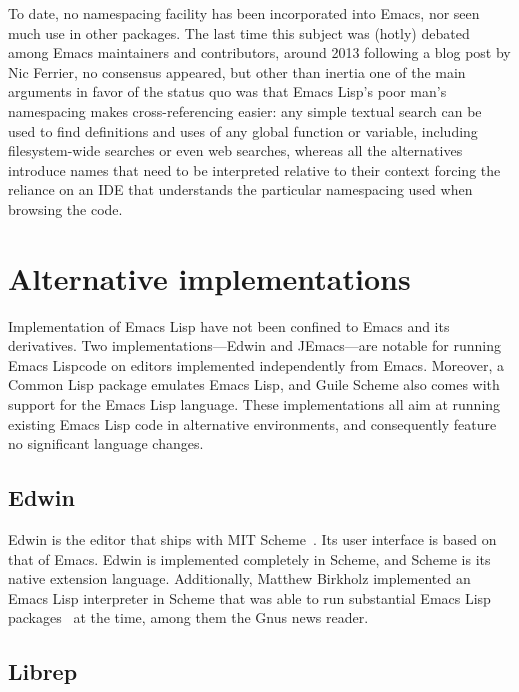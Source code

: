\documentclass[format=acmsmall, review]{acmart}
\newcommand \Elisp {Emacs Lisp}
\begin{document}
To date, no namespacing facility has been incorporated into Emacs, nor seen
much use in other packages.  The last time this subject was (hotly) debated
among Emacs maintainers and contributors, around 2013 following a blog post
by Nic Ferrier, no consensus appeared, but other than inertia one of the
main arguments in favor of the status quo was that \Elisp's poor man's
namespacing makes cross-referencing easier: any simple textual search can be
used to find definitions and uses of any global function or variable,
including filesystem-wide searches or even web searches,
whereas all the alternatives introduce names that need to be interpreted
relative to their context forcing the reliance on an IDE that understands the
particular namespacing used when browsing the code.



\section{Alternative implementations}
\label{sec:alternative-implementations}

Implementation of \Elisp{} have not been confined to Emacs and its
derivatives.  Two implementations---Edwin and JEmacs---are notable for
running \Elisp code on editors implemented independently from Emacs.
Moreover, a Common Lisp package emulates Emacs Lisp, and Guile Scheme
also comes with support for the \Elisp{} language.
These implementations all aim at running existing \Elisp{}
code in alternative environments, and consequently feature no
significant language changes.

\subsection{Edwin}

Edwin is the editor that ships with MIT Scheme~\cite{MITScheme2014}.
Its user interface is based on that of Emacs.  Edwin is implemented
completely in Scheme, and Scheme is its native extension language.
Additionally, Matthew Birkholz implemented an \Elisp{} interpreter
in Scheme that was able to run substantial \Elisp{}
packages~\cite{Birkholz1993} at the time, among them the Gnus news reader.

\subsection{Librep}
\end{document}
